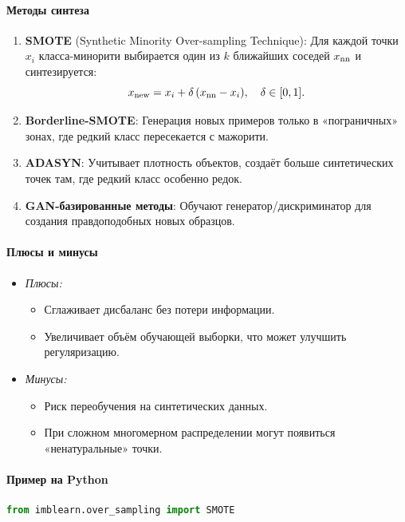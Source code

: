 \begin{center}
\paragraph{Методы синтеза}
\begin{enumerate}
  \item \textbf{SMOTE} (Synthetic Minority Over-sampling Technique):  
    Для каждой точки \(x_i\) класса-минорити выбирается один из \(k\) ближайших соседей \(x_{\rm nn}\) и синтезируется:
    \[
      x_{\rm new} = x_i + \delta\,(x_{\rm nn} - x_i),\quad \delta\in[0,1].
    \]
  \item \textbf{Borderline-SMOTE}:  
    Генерация новых примеров только в «пограничных» зонах, где редкий класс пересекается с мажорити.
  \item \textbf{ADASYN}:  
    Учитывает плотность объектов, создаёт больше синтетических точек там, где редкий класс особенно редок.
  \item \textbf{GAN-базированные методы}:  
    Обучают генератор/дискриминатор для создания правдоподобных новых образцов.
\end{enumerate}

\paragraph{Плюсы и минусы}
\begin{itemize}
  \item \emph{Плюсы:}  
    \begin{itemize}
      \item Сглаживает дисбаланс без потери информации.  
      \item Увеличивает объём обучающей выборки, что может улучшить регуляризацию.
    \end{itemize}
  \item \emph{Минусы:}  
    \begin{itemize}
      \item Риск переобучения на синтетических данных.  
      \item При сложном многомерном распределении могут появиться «ненатуральные» точки.
    \end{itemize}
\end{itemize}

\paragraph{Пример на Python}
\begin{lstlisting}[language=Python]
from imblearn.over_sampling import SMOTE


\end{lstlisting}
\end{center}
